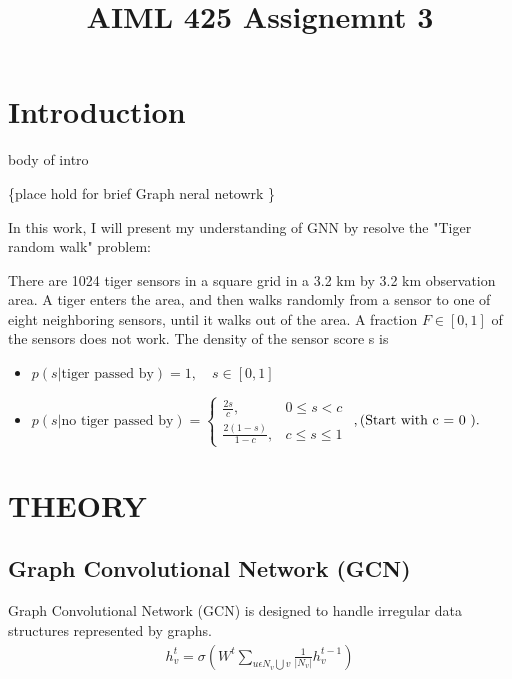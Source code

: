 \documentclass{article}
\title{AIML 425 Assignemnt 3}
\begin{document}
%
\maketitle
%
\section{Introduction}
\label{sec:intro}

body of intro

\{place hold for brief Graph neral netowrk \}

In this work, I will present my understanding of GNN by resolve the "Tiger random walk" problem:

There are 1024 tiger sensors in a square grid in a 3.2 km
by 3.2 km observation area. A tiger enters the area, and then
walks randomly from a sensor to one of eight neighboring
sensors, until it walks out of the area. A fraction $F \in [0, 1]$ of
the sensors does not work. The density of the sensor score s is

\begin{itemize}
  \item $p(s | \text{tiger passed by}) = 1, \quad s \in [0, 1]$
  \item $p(s | \text{no tiger passed by}) = \begin{cases} \frac{2s}{c}, & 0 \leq s < c \\\frac{2(1 - s)}{1 - c}, & c \leq s \leq 1 \end{cases}$
  $\\,\text{(Start with  c = 0 ).}$
\end{itemize}



\section{THEORY}
\label{sec:theory}

\subsection{Graph Convolutional Network (GCN)}
\label{ssec:gcn}

Graph Convolutional Network (GCN) is designed to handle irregular data structures represented by graphs. 
\begin{align}
  h_{v}^{t}=\sigma \left ( 
    W^t
    \sum_{u\epsilon N_v\bigcup v}
    \frac{1}{\left | N_v \right |} 
    h_{v}^{t-1}
    \right )
\end{align}
\end{document}
